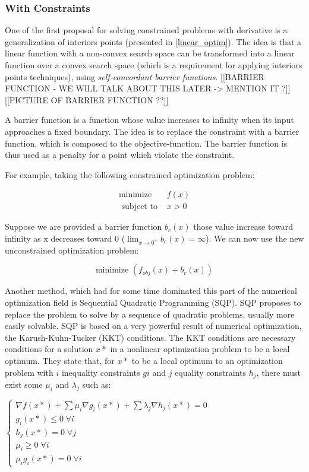\subsubsection{With Constraints}

One of the first proposal for solving constrained problems with derivative is a generalization of interiors points (presented in \ref{linear_optim}). The idea is that a linear function with a non-convex search space can be transformed into a linear function over a convex search space (which is a requirement for applying interiors points techniques), using \emph{self-concordant barrier functions}.
[[BARRIER FUNCTION - WE WILL TALK ABOUT THIS LATER -> MENTION IT ?]]
[[PICTURE OF BARRIER FUNCTION ??]]

A barrier function is a function whose value increases to infinity when its input approaches a fixed boundary.
The idea is to replace the constraint with a barrier function, which is composed to the objective-function. The barrier function is thus used as a penalty for a point which violate the constraint.

For example, taking the following constrained optimization problem:

\begin{align*}
\text{minimize } &f(x)\\
\text{ subject to } &x > 0
\end{align*}

Suppose we are provided a barrier function $b_c(x)$ those value increase toward infinity as x decreases toward 0 ($\lim_{x \to 0^+}b_c(x) = \infty$). We can now use the new unconstrained optimization problem:

$$\text{minimize } (f_{obj}(x) + b_c(x))$$

Another method, which had for some time dominated this part of the numerical optimization field is Sequential Quadratic Programming (SQP). SQP proposes to replace the problem to solve by a sequence of quadratic problems, usually more easily solvable.
SQP is based on a very powerful result of numerical optimization, the Karush-Kuhn-Tucker (KKT) conditions. The KKT conditions are necessary conditions for a solution $x*$ in a nonlinear optimization problem to be a local optimum. They state that, for $x*$ to be a local optimum to an optimization problem with $i$ inequality constraints $gi$ and $j$ equality constraints $h_j$, there must exist some $\mu_i$ and $\lambda_j$ such as:

$\left\{
 		 \begin{array}{l}
			\nabla f(x*) + \sum \mu_i \nabla g_i(x*) + \sum \lambda_j \nabla h_j(x*) = 0 \\
			g_i(x*) \leq 0 \;\forall i \\
			h_j(x*) = 0 \;\forall j \\
			\mu_i \geq 0 \;\forall i\\
			\mu_ig_i(x*) = 0 \;\forall i
		\end{array}
	\right. $
	
